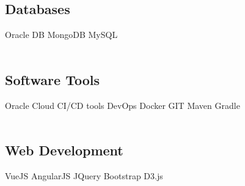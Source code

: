 \documentclass[]{resume-openfont}
\begin{document}
\begin{minipage}[t]{0.33\textwidth}
\subsection{Databases}
Oracle DB \textbullet{} MongoDB \textbullet{} MySQL \\~\\ 
\subsection{Software Tools}
Oracle Cloud \textbullet{} CI/CD tools \textbullet{} DevOps \textbullet{} Docker \textbullet{} GIT \textbullet{} Maven \textbullet{} Gradle \\~\\ 
\subsection{Web Development}
VueJS \textbullet{}  AngularJS \textbullet{} JQuery \textbullet{} Bootstrap \textbullet{} D3.js \\~\\

%
%

\end{minipage} 
\hfill
\end{document}
